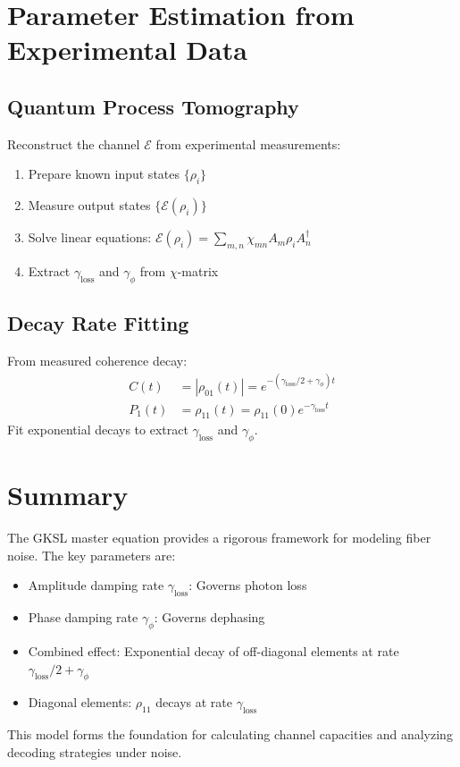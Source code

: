\documentclass[12pt]{article}
\begin{document}
\section{Parameter Estimation from Experimental Data}

\subsection{Quantum Process Tomography}
Reconstruct the channel $\mathcal{E}$ from experimental measurements:
\begin{enumerate}
    \item Prepare known input states $\{\rho_i\}$
    \item Measure output states $\{\mathcal{E}(\rho_i)\}$
    \item Solve linear equations: $\mathcal{E}(\rho_i) = \sum_{m,n} \chi_{mn} A_m \rho_i A_n^\dagger$
    \item Extract $\gamma_{\text{loss}}$ and $\gamma_{\phi}$ from $\chi$-matrix
\end{enumerate}

\subsection{Decay Rate Fitting}
From measured coherence decay:
\begin{align}
C(t) &= |\rho_{01}(t)| = e^{-(\gamma_{\text{loss}}/2 + \gamma_{\phi})t} \\
P_1(t) &= \rho_{11}(t) = \rho_{11}(0) e^{-\gamma_{\text{loss}}t}
\end{align}
Fit exponential decays to extract $\gamma_{\text{loss}}$ and $\gamma_{\phi}$.

\section{Summary}
The GKSL master equation provides a rigorous framework for modeling fiber noise. The key parameters are:
\begin{itemize}
    \item Amplitude damping rate $\gamma_{\text{loss}}$: Governs photon loss
    \item Phase damping rate $\gamma_{\phi}$: Governs dephasing
    \item Combined effect: Exponential decay of off-diagonal elements at rate $\gamma_{\text{loss}}/2 + \gamma_{\phi}$
    \item Diagonal elements: $\rho_{11}$ decays at rate $\gamma_{\text{loss}}$
\end{itemize}

This model forms the foundation for calculating channel capacities and analyzing decoding strategies under noise.
\end{document}
